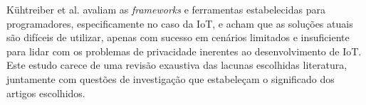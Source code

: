 \documentclass[conference]{IEEEtran}
\begin{document}

Kühtreiber et al. \cite{Kuhtreiber2022survey} avaliam as \textit{frameworks}
e ferramentas estabelecidas para programadores, especificamente no caso da
IoT, e acham que as soluções atuais são difíceis de utilizar, apenas com
sucesso em cenários limitados e insuficiente para lidar com os problemas
de privacidade inerentes ao desenvolvimento de IoT. Este estudo carece de
uma revisão exaustiva das lacunas escolhidas literatura, juntamente com questões
de investigação que estabeleçam o significado dos artigos escolhidos.

\end{document}
